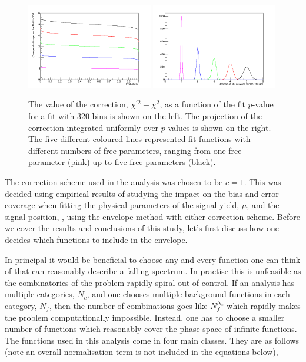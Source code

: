 \begin{figure}
  \begin{center}
    \includegraphics[width=0.49\textwidth]{analysis/plots/ChisqConv1.png}
    \includegraphics[width=0.49\textwidth]{analysis/plots/ChisqConv2.png}
    \caption[An estimation of the correction required in the envelope method]{The value of the correction, $\chi^{\prime 2} - \chi^{2}$, as a function of the fit $p$-value for a fit with 320 bins is shown on the left. The projection of the correction integrated uniformly over $p$-values is shown on the right. The five different coloured lines represented fit functions with different numbers of free parameters, ranging from one free parameter (pink) up to five free parameters (black).}
    \label{fig:envelope_chi2_correction}
  \end{center}
\end{figure}
The correction scheme used in the analysis was chosen to be $c=1$. This was decided using empirical results of studying the impact on the bias and error coverage when fitting the physical parameters of the signal yield, $\mu$, and the signal position, \mH, using the envelope method with either correction scheme. Before we cover the results and conclusions of this study, let's first discuss how one decides which functions to include in the envelope.

In principal it would be beneficial to choose any and every function one can think of that can reasonably describe a falling spectrum. In practise this is unfeasible as the combinatorics of the problem rapidly spiral out of control. If an analysis has multiple categories, $N_{c}$, and one chooses multiple background functions in each category, $N_{f}$, then the number of combinations goes like $N_{f}^{N_{c}}$ which rapidly makes the problem computationally impossible. Instead, one has to choose a smaller number of functions which reasonably cover the phase space of infinite functions. The functions used in this analysis come in four main classes. They are as follows (note an overall normalisation term is not included in the equations below),


